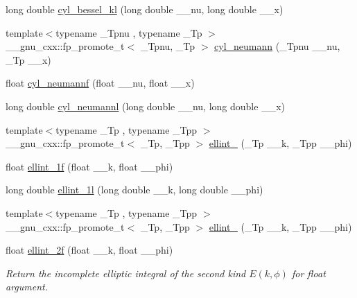 \begin{DoxyCompactItemize}
\item 
long double \hyperlink{group__mathsf__std_gac35194b926270d7857d651e06198c7d3}{cyl\+\_\+bessel\+\_\+kl} (long double \+\_\+\+\_\+nu, long double \+\_\+\+\_\+x)
\item 
{\footnotesize template$<$typename \+\_\+\+Tpnu , typename \+\_\+\+Tp $>$ }\\\+\_\+\+\_\+gnu\+\_\+cxx\+::fp\+\_\+promote\+\_\+t$<$ \+\_\+\+Tpnu, \+\_\+\+Tp $>$ \hyperlink{group__mathsf__std_ga1e4bef23704469b0704cf15c5f04e29e}{cyl\+\_\+neumann} (\+\_\+\+Tpnu \+\_\+\+\_\+nu, \+\_\+\+Tp \+\_\+\+\_\+x)
\item 
float \hyperlink{group__mathsf__std_ga604c13e8f2bb7cd3c7c91d8b19d6b13a}{cyl\+\_\+neumannf} (float \+\_\+\+\_\+nu, float \+\_\+\+\_\+x)
\item 
long double \hyperlink{group__mathsf__std_gaf8986bae9a523c48d861d233835bda8f}{cyl\+\_\+neumannl} (long double \+\_\+\+\_\+nu, long double \+\_\+\+\_\+x)
\item 
{\footnotesize template$<$typename \+\_\+\+Tp , typename \+\_\+\+Tpp $>$ }\\\+\_\+\+\_\+gnu\+\_\+cxx\+::fp\+\_\+promote\+\_\+t$<$ \+\_\+\+Tp, \+\_\+\+Tpp $>$ \hyperlink{group__mathsf__std_ga1550d6947bbbeee9865aabd398102a36}{ellint\+\_} (\+\_\+\+Tp \+\_\+\+\_\+k, \+\_\+\+Tpp \+\_\+\+\_\+phi)
\item 
float \hyperlink{group__mathsf__std_ga308d23d70f4b5e848eb7a4173628ef3b}{ellint\+\_\+1f} (float \+\_\+\+\_\+k, float \+\_\+\+\_\+phi)
\item 
long double \hyperlink{group__mathsf__std_ga795383fa51e02351000b410b478d824f}{ellint\+\_\+1l} (long double \+\_\+\+\_\+k, long double \+\_\+\+\_\+phi)
\item 
{\footnotesize template$<$typename \+\_\+\+Tp , typename \+\_\+\+Tpp $>$ }\\\+\_\+\+\_\+gnu\+\_\+cxx\+::fp\+\_\+promote\+\_\+t$<$ \+\_\+\+Tp, \+\_\+\+Tpp $>$ \hyperlink{group__mathsf__std_gad64cb9babb7837d585912b1a94b2cb7d}{ellint\+\_} (\+\_\+\+Tp \+\_\+\+\_\+k, \+\_\+\+Tpp \+\_\+\+\_\+phi)
\item 
float \hyperlink{group__mathsf__std_ga594a730163c6228c75b152462700062b}{ellint\+\_\+2f} (float \+\_\+\+\_\+k, float \+\_\+\+\_\+phi)
\begin{DoxyCompactList}\small\item\em Return the incomplete elliptic integral of the second kind $ E(k,\phi) $ for {\ttfamily float} argument. \end{DoxyCompactList}\item 

\end{DoxyCompactItemize}
